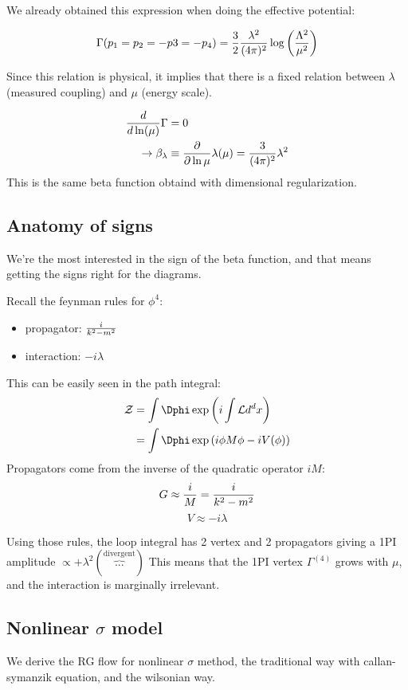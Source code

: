 \documentclass[11pt]{scrartcl}
\begin{document}
We already obtained this expression when doing the effective potential:

\begin{align}
	\Gamma(p_1 = p_2 = -p3 = -p_4) = {3 \over 2} {\lambda^2 \over (4 \pi)^2} \log \left({\Lambda^2 \over \mu^2} \right)
	\end{align}

Since this relation is physical, it implies that there is a fixed relation between $\lambda$ (measured coupling) and $\mu$ (energy scale).

\begin{align}
	{d \over d \ln (\mu)} \Gamma & = 0 \\
	\rightarrow \beta_{\lambda} & \equiv {\partial \over \partial \ln \mu} \lambda(\mu)= {3 \over (4 \pi)^2} \lambda^2
	\end{align}
This is the same beta function obtaind with dimensional regularization.

\subsection{Anatomy of signs}
We're the most interested in the sign of the beta function, and that means getting the signs right for the diagrams.

Recall the feynman rules for $\phi^4$:
\begin{itemize}
	\item propagator: ${i \over k^2 - m^2}$
	\item interaction: $ - i \lambda$
	\end{itemize}

This can be easily seen in the path integral:
\begin{align}
	\mathcal{Z} &= \int \Dphi \exp \left(i \int \mathcal{L} d^d x \right) \\
						 & = \int \Dphi \exp \left( {i \phi M \phi} - i V(\phi) \right)
	\end{align}
Propagators come from the inverse of the quadratic operator $ i M$:
$$G \approx {i \over M} = {i \over k^2 - m^2}$$
$$ V \approx - i \lambda$$

Using those rules, the loop integral has 2 vertex and 2 propagators giving a 1PI amplitude $\propto + \lambda^2 (\overbrace{...}^{\text{divergent}})$
This means that the 1PI vertex $\Gamma^{(4)}$ grows with $\mu$, and the interaction is marginally irrelevant.



\subsection{Nonlinear $\sigma$ model}
We derive the RG flow for nonlinear $\sigma$ method, the traditional way with callan-symanzik equation, and the wilsonian way.
\end{document}
